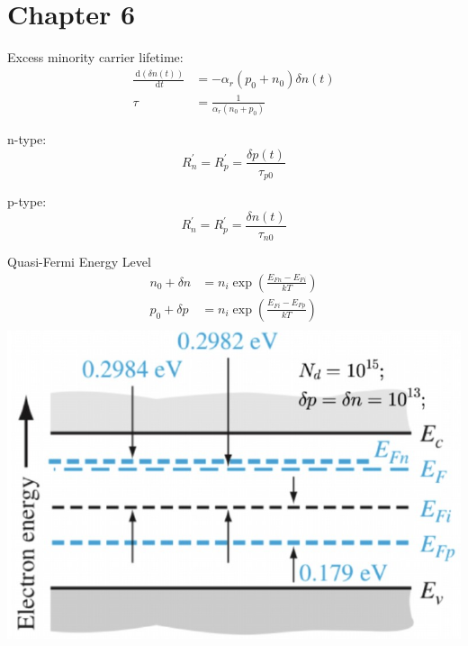 \documentclass[a4paper, twocolumn]{article}
\begin{document}
\renewcommand{\thesection}{\Roman{section}}
\renewcommand{\thesubsection}{\Alph{subsection}}
\renewcommand{\thesubsubsection}{\thesubsection.\arabic{subsubsection}}
\renewcommand{\d}{\: \mathrm{d} }
\newcommand{\e}{\mathrm{e}}

\section{Chapter 6}
    Excess minority carrier lifetime:
    \begin{equation*}
        \begin{aligned}
            \frac{\d (\delta n(t))}{\d t} &= - \alpha_r (p_0 + n_0) \delta n(t) \\
            \tau &= \frac{1}{\alpha_r (n_0 + p_0)}
        \end{aligned}
    \end{equation*}
    \par n-type:
    \begin{equation*}
        R^\prime_n = R^\prime_p = \frac{\delta p(t)}{\tau_{p0}}
    \end{equation*}
    \par p-type:
    \begin{equation*}
        R^\prime_n = R^\prime_p = \frac{\delta n(t)}{\tau_{n0}} 
    \end{equation*}
    
    \par Quasi-Fermi Energy Level
    \begin{equation*}
        \begin{aligned}
            n_0 + \delta n &= n_i \exp \left( \frac{E_{Fn} - E_{Fi}}{kT}  \right) \\
            p_0 + \delta p &= n_i \exp \left( \frac{E_{Fi} - E_{Fp}}{kT}  \right) \\
        \end{aligned}
    \end{equation*}
        \includegraphics[width=0.8\linewidth]{Quasi-fermi-level-1.jpg}\\
    
\end{document}
